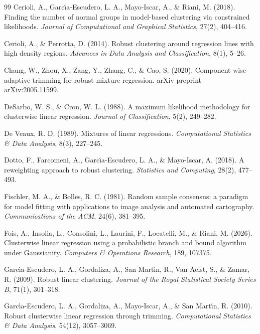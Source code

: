 \begin{thebibliography}{99}
 Cerioli, A., Garc\'{\i}a-Escudero, L. A., Mayo-Iscar, A., \& Riani, M. (2018). Finding the number of normal groups in model-based clustering via constrained likelihoods. \textit{Journal of Computational and Graphical Statistics}, 27(2), 404--416.

 Cerioli, A., \& Perrotta, D. (2014). Robust clustering around regression lines with high density regions. \textit{Advances in Data Analysis and Classification}, 8(1), 5--26.

 Chang, W., Zhou, X., Zang, Y., Zhang, C., \& Cao, S. (2020). Component-wise adaptive trimming for robust mixture regression. arXiv preprint arXiv:2005.11599.

 DeSarbo, W. S., \& Cron, W. L. (1988). A
maximum likelihood methodology for clusterwise linear regression. \textit{Journal of
Classification}, 5(2), 249--282.

 De Veaux, R. D. (1989). Mixtures of linear regressions. \textit{Computational Statistics \& Data Analysis}, 8(3), 227--245.

 Dotto, F., Farcomeni, A.,
Garc\'{\i}a-Escudero, L. A., \& Mayo-Iscar, A. (2018). A reweighting approach to robust
clustering. \textit{Statistics and Computing}, 28(2), 477--493.

 Fischler, M. A., \& Bolles, R. C. (1981). Random sample consensus: a paradigm for model fitting with applications to image analysis and automated cartography. \textit{Communications of the ACM}, 24(6), 381--395.

 Fois, A., Insolia, L., Consolini, L., Laurini, F., Locatelli, M., \& Riani, M. (2026). Clusterwise linear regression using a probabilistic branch and bound algorithm under Gaussianity. \textit{Computers \& Operations Research}, 189, 107375.

 Garc\'{\i}a-Escudero, L. A., Gordaliza, A., San Mart\'{\i}n, R., Van Aelst, S., \& Zamar, R. (2009). Robust linear clustering. \textit{Journal of the Royal Statistical Society Series B}, 71(1), 301--318.

Garc\'{\i}a-Escudero, L. A., Gordaliza, A., Mayo-Iscar, A., \& San Mart\'{\i}n, R. (2010).
Robust clusterwise linear regression through trimming. \textit{Computational Statistics \&
Data Analysis}, 54(12), 3057--3069.


\end{thebibliography}
